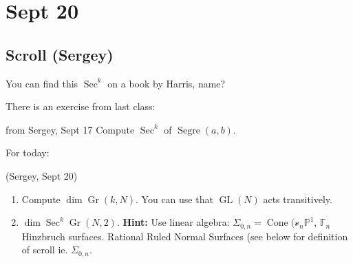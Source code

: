 \section{Sept 20}
\subsection{Scroll (Sergey)}

You can find this $\operatorname{Sec}^k$ on a book by Harris, name?

There is an exercise from last class:
\begin{manualexercise}{from Sergey, Sept 17}
	Compute $\operatorname{Sec}^k $ of $\operatorname{Segre}(a,b)$.
\end{manualexercise}

For today:
\begin{manualexercise}{(Sergey, Sept 20)}\leavevmode 
	\begin{enumerate}[label=\alph*.]
		\item Compute $\dim \operatorname{Gr}(k,N)$. You can use that $\operatorname{GL}(N)$ acts transitively.
		\item $\dim \operatorname{Sec}^k\operatorname{Gr}(N,2)$. \textbf{Hint:} Use linear algebra: $\Sigma_{0,n}=\operatorname{Cone}(\mathcal{v}_{n}\mathbb{P}^1$, $\mathbb{F}_{n}$ Hinzbruch surfaces. Rational Ruled Normal Surfaces (see below for definition of scroll ie. $\Sigma_{0,n}$.
	\end{enumerate}
\end{manualexercise}

